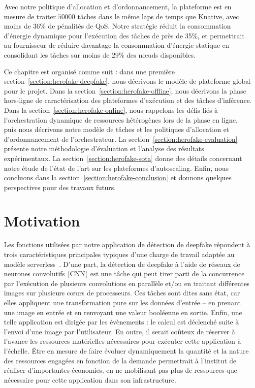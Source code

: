 
Avec notre politique d'allocation et d'ordonnancement, la plateforme est en mesure de traiter $50 000$ tâches dans le même laps de temps que Knative, avec moins de 36\% de pénalités de QoS. Notre stratégie réduit la consommation d'énergie dynamique pour l'exécution des tâches de près de 35\%, et permettrait au fournisseur de réduire davantage la consommation d'énergie statique en consolidant les tâches sur moins de 29\% des nœuds disponibles.

Ce chapitre est organisé comme suit : dans une première section~\ref{section:herofake-deepfake}, nous décrivons le modèle de plateforme global pour le projet. Dans la section~\ref{section:herofake-offline}, nous décrivons la phase hors-ligne de caractérisation des plateformes d'exécution et des tâches d'inférence. Dans la section~\ref{section:herofake-online}, nous rappelons les défis liés à l'orchestration dynamique de ressources hétérogènes lors de la phase en ligne, puis nous décrivons notre modèle de tâches et les politiques d'allocation et d'ordonnancement de l'orchestrateur. La section~\ref{section:herofake-evaluation} présente notre méthodologie d'évaluation et l'analyse des résultats expérimentaux. La section~\ref{section:herofake-sota} donne des détails concernant notre étude de l'état de l'art sur les plateformes d'autoscaling. Enfin, nous concluons dans la section~\ref{section:herofake-conclusion} et donnons quelques perspectives pour des travaux futurs.

\section{Motivation}
\label{section:herofake-motivation}

Les fonctions utilisées par notre application de détection de deepfake répondent à trois caractéristiques principales typiques d'une charge de travail adaptée au modèle serverless~\cite{cncf2018whitepaper}. D'une part, la détection de deepfake à l'aide de réseaux de neurones convolutifs (CNN) est une tâche qui peut tirer parti de la concurrence par l'exécution de plusieurs convolutions en parallèle et/ou en traitant différentes images sur plusieurs cœurs de processeurs. Ces tâches sont dites sans état, car elles appliquent une transformation pure sur les données d'entrée -- en prenant une image en entrée et en renvoyant une valeur booléenne en sortie. Enfin, une telle application est dirigée par les évènements : le calcul est déclenché suite à l'envoi d'une image par l'utilisateur.
En outre, il serait coûteux de réserver à l'avance les ressources matérielles nécessaires pour exécuter cette application à l'échelle. Être en mesure de faire évoluer dynamiquement la quantité et la nature des ressources engagées en fonction de la demande permettrait à l'institut de réaliser d'importantes économies, en ne mobilisant pas plus de ressources que nécessaire pour cette application dans son infrastructure.


